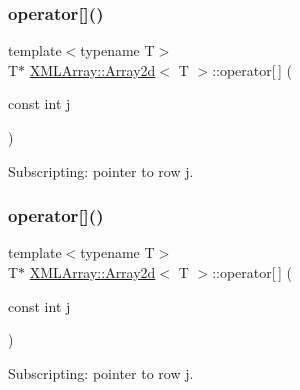 \subsubsection{\texorpdfstring{operator[]()}{operator[]()}\hspace{0.1cm}{\footnotesize\ttfamily [1/4]}}
{\footnotesize\ttfamily template$<$typename T$>$ \\
T$\ast$ \mbox{\hyperlink{classXMLArray_1_1Array2d}{X\+M\+L\+Array\+::\+Array2d}}$<$ T $>$\+::operator\mbox{[}$\,$\mbox{]} (\begin{DoxyParamCaption}\item[{const int}]{j }\end{DoxyParamCaption})\hspace{0.3cm}{\ttfamily [inline]}}



Subscripting\+: pointer to row j. 

\mbox{\label{classXMLArray_1_1Array2d_a1e5b7fa596ec682113700320b08e66d5}} 
\subsubsection{\texorpdfstring{operator[]()}{operator[]()}\hspace{0.1cm}{\footnotesize\ttfamily [2/4]}}
{\footnotesize\ttfamily template$<$typename T$>$ \\
T$\ast$ \mbox{\hyperlink{classXMLArray_1_1Array2d}{X\+M\+L\+Array\+::\+Array2d}}$<$ T $>$\+::operator\mbox{[}$\,$\mbox{]} (\begin{DoxyParamCaption}\item[{const int}]{j }\end{DoxyParamCaption})\hspace{0.3cm}{\ttfamily [inline]}}



Subscripting\+: pointer to row j. 

\mbox{\label{classXMLArray_1_1Array2d_a956a4739a0e6529302542b0fdf3c1da8}} 
